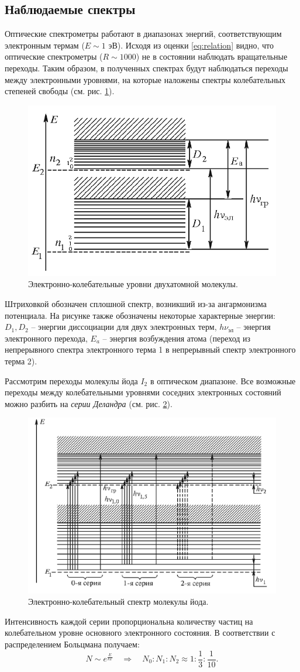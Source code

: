 \documentclass[12pt,a4paper]{article}
\newcommand{\figref}[1]{(см. рис. \ref{#1})}
\begin{document}
	\subsection*{Наблюдаемые спектры}
	
	Оптические спектрометры работают в диапазонах энергий, соответствующим электронным термам ($E \sim 1$ эВ). Исходя из оценки \eqref{eq:relation} видно, что оптические спектрометры ($R \sim 1000$) не в состоянии наблюдать вращательные переходы. Таким образом, в полученных спектрах будут наблюдаться переходы между электронными уровнями, на которые наложены спектры колебательных степеней свободы \figref{fig:term_pair}.
	
	\begin{figure}[H]
		\centering
		\includegraphics[width=0.6\linewidth]{res/term_pair.png}
		\caption{Электронно-колебательные уровни двухатомной молекулы.}
		\label{fig:term_pair}
	\end{figure}
	
	Штриховкой обозначен сплошной спектр, возникший из-за ангармонизма потенциала. На рисунке также обозначены некоторые характерные энергии:
	$D_1, D_2$ -- энергии диссоциации для двух электронных терм, $h\nu_{\text{эл}}$ -- энергия электронного перехода, $E_a$ -- энергия возбуждения атома (переход из непрерывного спектра электронного терма 1 в непрерывный спектр электронного терма 2).
	
	Рассмотрим переходы молекулы йода $I_2$ в оптическом диапазоне. Все возможные переходы между колебательными уровнями соседних электронных состояний можно разбить на \textit{серии Деландра} \figref{fig:delandr_series}.
	\begin{figure}[H]
		\centering
		\includegraphics[width=0.6\linewidth]{res/delandr_series.png}
		\caption{Электронно-колебательный спектр молекулы йода.}
		\label{fig:delandr_series}
	\end{figure}
	Интенсивность каждой серии пропорциональна количеству частиц на колебательном уровне основного электронного состояния. В соответствии с распределением Больцмана получаем:
	$$ N \sim e^{\frac{E}{kT}} \quad \Rightarrow \quad N_0 : N_1 : N_2 \approx 1 : \frac{1}{3} : \frac{1}{10}. $$
	
\end{document}
